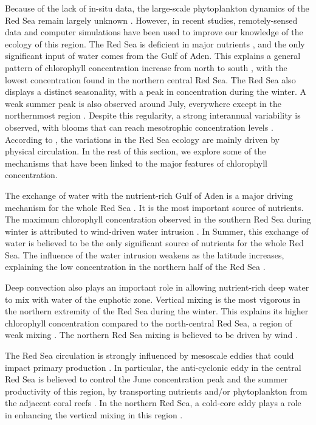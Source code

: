 Because of the lack of in-situ data, the large-scale phytoplankton dynamics of
the Red Sea remain largely unknown \citep{Raitsos2013, Triantafyllou2014}.
However, in recent studies, remotely-sensed data and computer simulations have
been used to improve our knowledge of the ecology of this region. The Red Sea
is deficient in major nutrients \citep{Weikert1987}, and the only significant
input of water comes from the Gulf of Aden. This explains a general pattern of
chlorophyll concentration increase from north to south \citep{Raitsos2013},
with the lowest concentration found in the northern central Red Sea. The Red
Sea also displays a distinct seasonality, with a peak in concentration during
the winter.  A weak summer peak is also observed around July, everywhere except
in the northernmost region \citep{Raitsos2013}. Despite this regularity, a
strong interannual variability is observed, with blooms that can reach
mesotrophic concentration levels \citep{Raitsos2013}. According to
\citet{Triantafyllou2014}, the variations in the Red Sea ecology are mainly
driven by physical circulation. In the rest of this section, we explore some of
the mechanisms that have been linked to the major features of chlorophyll
concentration.

The exchange of water with the nutrient-rich Gulf of Aden is a major driving
mechanism for the whole Red Sea \citep{Triantafyllou2014}. It is the most
important source of nutrients. The maximum chlorophyll concentration observed
in the southern Red Sea during winter is attributed to wind-driven water
intrusion \citep{Raitsos2013}. In Summer, this exchange of water is believed to
be the only significant source of nutrients for the whole Red Sea. The
influence of the water intrusion weakens as the latitude increases, explaining
the low concentration in the northern half of the Red Sea \citep{Raitsos2013}.

Deep convection also plays an important role in allowing nutrient-rich deep
water to mix with water of the euphotic zone. Vertical mixing is the most
vigorous in the northern extremity of the Red Sea during the winter. This
explains its higher chlorophyll concentration compared to the north-central Red
Sea, a region of weak mixing \citep{Raitsos2013}. The northern Red Sea mixing
is believed to be driven by wind \citep{Raitsos2013}.

The Red Sea circulation is strongly influenced by mesoscale eddies
\citep{Yao2014, Yao2014b, Zhan2014} that could impact primary production
\citep{Zhai2013}.  In particular, the anti-cyclonic eddy in the central Red Sea
is believed to control the June concentration peak and the summer productivity
of this region, by transporting nutrients and/or phytoplankton from the
adjacent coral reefs \citep{Raitsos2013}. In the northern Red Sea, a cold-core
eddy plays a role in enhancing the vertical mixing in this region
\citep{Raitsos2013}.

